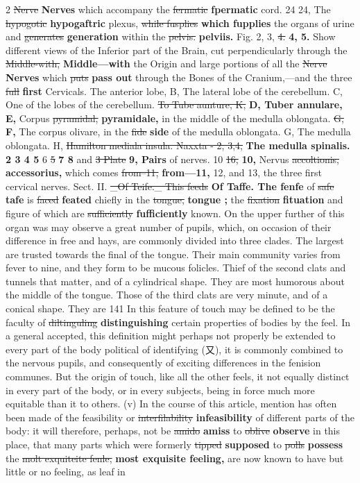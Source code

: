 \documentclass[10pt]{article}
\begin{document}
\begin{multicols}{2}
\sout{Nerve} \textbf{Nerves} which accompany the \sout{fermatic} \textbf{fpermatic} cord. 24 24, The \sout{hypogotic} \textbf{hypogaftric} plexus, \sout{while fusplies} \textbf{which fupplies} the organs of urine and \sout{generates} \textbf{generation} within the \sout{pelvis.} \textbf{pelviis.} Fig. 2, 3, \sout{4.} \textbf{4, 5.} Show different views of the Inferior part of the Brain, cut perpendicularly through the \sout{Middle-with,} \textbf{Middle—with} the Origin and large portions of all the \sout{Nerve} \textbf{Nerves} which \sout{puts} \textbf{pass out} through the Bones of the Cranium,—and the three \sout{full} \textbf{first} Cervicals. The anterior lobe, B, The lateral lobe of the cerebellum. C, One of the lobes of the cerebellum. \sout{To Tube aunture, K,} \textbf{D, Tuber annulare, E,} Corpus \sout{pyramidal,} \textbf{pyramidale,} in the middle of the medulla oblongata. \sout{G,} \textbf{F,} The corpus olivare, in the \sout{fide} \textbf{side} of the medulla oblongata. G, The medulla oblongata. H, \sout{Hamilton mediala insula. Naxxta - 2, 3,4,} \textbf{The medulla spinalis. 2 3 4 5} 6 \sout{5} \textbf{7 8} and \sout{3 Plate} \textbf{9, Pairs} of nerves. 10 \sout{16,} \textbf{10,} Nervus \sout{accoltionis,} \textbf{accessorius,} which comes \sout{from--11,} \textbf{from—11,} 12, and 13, the three first cervical nerves. Sect. II. \sout{\_Of Teife.\_ This feeds} \textbf{Of Taffe. The fenfe} of \sout{safe} \textbf{tafe} is \sout{faced} \textbf{feated} chiefly in the \sout{tongue,} \textbf{tongue ;} the \sout{fixation} \textbf{fituation} and figure of which are \sout{sufficiently} \textbf{fufficiently} known. On the upper further of this organ was may observe a great number of pupils, which, on occasion of their difference in free and hays, are commonly divided into three clades. The largest are trusted towards the final of the tongue. Their main community varies from fever to nine, and they form to be mucous folicles. Thief of the second clats and tunnels that matter, and of a cylindrical shape. They are most humorous about the middle of the tongue. Those of the third clats are very minute, and of a conical shape. They are 141 In this feature of touch may be defined to be the faculty of \sout{diltinguling} \textbf{distinguishing} certain properties of bodies by the feel. In a general accepted, this definition might perhaps not properly be extended to every part of the body political of identifying (又), it is commonly combined to the nervous pupils, and consequently of exciting differences in the fenision communes. But the origin of touch, like all the other feels, it not equally distinct in every part of the body, or in every subjects, being in force much more equitable than it to others. (v) In the course of this article, mention has often been made of the feasibility or \sout{interfilability} \textbf{infeasibility} of different parts of the body: it will therefore, perhaps, not be \sout{amido} \textbf{amiss} to \sout{oblive} \textbf{observe} in this place, that many parts which were formerly \sout{tipped} \textbf{supposed} to \sout{polls} \textbf{possess} the \sout{molt exquiteite fenle,} \textbf{most exquisite feeling,} are now known to have but little or no feeling, as leaf in 
\end{multicols}
\end{document}
